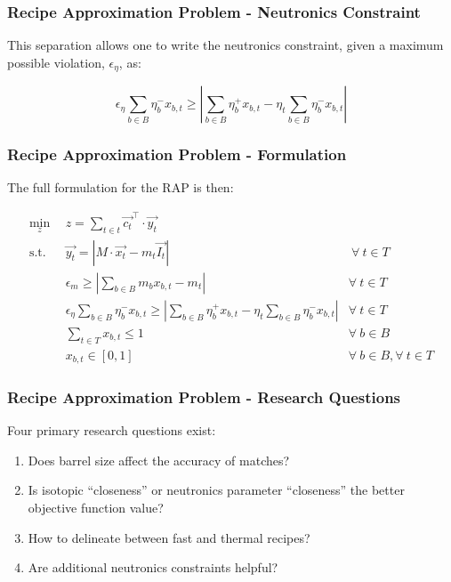 \begin{frame}[ctb!]
  \frametitle{Recipe Approximation Problem - Neutronics Constraint} 

  This separation allows one to write the neutronics constraint, given a maximum
  possible violation, $\epsilon_{\eta}$, as:

  \begin{equation}
    \label{eqs:eta_linear}
    \epsilon_{\eta} \sum_{b \in B} \eta_{b}^{-} x_{b,t} \geq
    \left| \sum_{b \in B} \eta_{b}^{+} x_{b,t}
    - \eta_{t} \sum_{b \in B} \eta_{b}^{-} x_{b,t} \right|
  \end{equation}  
\end{frame}

\begin{frame}[ctb!]
  \frametitle{Recipe Approximation Problem - Formulation}

  The full formulation for the RAP is then:

  \begin{subequations}\label{eqs:rap}
    \begin{align}
      \min_{z} \:\: & 
      z = \sum_{t \in t} \vec{c_{t}}^{\top} \cdot \vec{y_{t}}
      & \label{eqs:rap_obj} \\
      \text{s.t.} \:\: &
      \vec{y_{t}} = \left| M \cdot \vec{x_{t}}  - m_t \vec{I_{t}} \right|
      &
      \: \forall \: t \in T \label{eqs:rap_iso} \\
      &
      \epsilon_{m} \geq \left| \sum_{b \in B} m_{b} x_{b, t} - m_{t} \right|
      & 
      \forall \: t \in T \label{eqs:rap_mass} \\
      &
      \epsilon_{\eta} \sum_{b \in B} \eta_{b}^{-} x_{b, t} \geq 
      \left| \sum_{b \in B} \eta_{b}^{+} x_{b, t} - 
      \eta_{t} \sum_{b \in B} \eta_{b}^{-} x_{b, t} \right|
      & 
      \forall \: t \in T \label{eqs:rap_eta} \\
      &
      \sum_{t \in T} x_{b, t} \leq 1
      & 
      \forall \: b \in B \label{eqs:rap_conserv} \\
      &
      x_{b, t} \in \left[ 0, 1 \right]
      & 
      \forall \: b \in B, \forall \: t \in T  \label{eqs:rap_x}
    \end{align}
  \end{subequations}
\end{frame}

\begin{frame}[ctb!]
  \frametitle{Recipe Approximation Problem - Research Questions} 

  Four primary research questions exist:

  \begin{enumerate}
    \item Does barrel size affect the accuracy of matches?
    \item Is isotopic ``closeness'' or neutronics parameter ``closeness'' the
      better objective function value?
    \item How to delineate between fast and thermal recipes?
    \item Are additional neutronics constraints helpful?
  \end{enumerate}
\end{frame}


